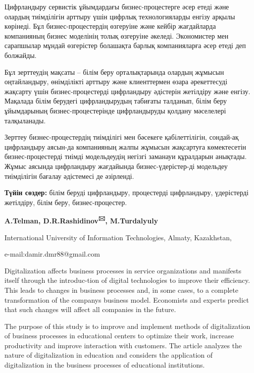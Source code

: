 Цифрландыру сервистік ұйымдардағы бизнес-процестерге әсер етеді және
олардың тиімділігін арттыру үшін цифрлық технологияларды енгізу арқылы
көрінеді. Бұл бизнес-процестердің өзгеруіне және кейбір жағдайларда
компанияның бизнес моделінің толық өзгеруіне әкеледі. Экономистер мен
сарапшылар мұндай өзгерістер болашақта барлық компанияларға әсер етеді
деп болжайды.

Бұл зерттеудің мақсаты -- білім беру орталықтарында олардың жұмысын
оңтайландыру, өнімділікті арттыру және клиенттермен өзара әрекеттесуді
жақсарту үшін бизнес-процестерді цифрландыру әдістерін жетілдіру және
енгізу. Мақалада білім берудегі цифрландырудың табиғаты талданып, білім
беру ұйымдарының бизнес-процестерінде цифрландыруды қолдану мәселелері
талқыланады.

Зерттеу бизнес-процестердің тиімділігі мен бәсекеге қабілеттілігін,
сондай-ақ цифрландыру аясын-да компанияның жалпы жұмысын жақсартуға
көмектесетін бизнес-процестерді тиімді модельдеудің негізгі заманауи
құралдарын анықтады. Жұмыс аясында цифрландыру жағдайында
бизнес-үдерістер-ді модельдеу тиімділігін бағалау әдістемесі де
әзірленді.

{\bfseries Түйін сөздер:} білім беруді цифрландыру, процестерді
цифрландыру, үдерістерді жетілдіру, білім беру, бизнес-процестер.

\begin{center}

{\bfseries A.Telman, D.R.Rashidinov\textsuperscript{🖂}, M.Turdalyuly}

International University of Information Technologies, Almaty,
Kazakhstan,

e-mail:damir.dmr88@gmail.com
\end{center}

Digitalization affects business processes in service organizations and
manifests itself through the introduc-tion of digital technologies to
improve their efficiency. This leads to changes in business processes
and, in some cases, to a complete transformation of the
company\textquotesingle s business model. Economists and experts predict
that such changes will affect all companies in the future.

The purpose of this study is to improve and implement methods of
digitalization of business processes in educational centers to optimize
their work, increase productivity and improve interaction with
customers. The article analyzes the nature of digitalization in
education and considers the application of digitalization in the
business processes of educational institutions.

